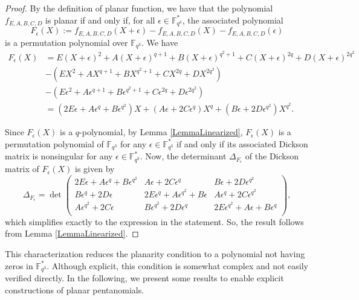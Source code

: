 \documentclass[12pt]{amsart}
\def\e{\epsilon}
\def\fqt{\mathbb{F}_{q^3}}
\def\e{\epsilon}
\begin{document}
	\begin{proof}
		By the definition of planar function, we have that the polynomial $f_{E,A,B,C,D}$ is planar if and only if, for all
		$ \epsilon \in \mathbb{F}_{q^3}^*$, the associated polynomial $$F_{\epsilon}(X):=f_{E,A,B,C,D}(X+\epsilon)-f_{E,A,B,C,D}(X)-f_{E,A,B,C,D}(\epsilon)$$ is a permutation polynomial over $\mathbb{F}_{q^3}$.  We have 
		\begin{align*}
			F_{\epsilon}(X)&= E(X+\e)^2+A(X+\e)^{q+1}+ B(X+\e)^{q^2+1}+C(X+\e)^{2q} +D(X+\e)^{2q^2}\\
			&-(EX^2+ AX^{q+1}+ BX^{q^2+1}+CX^{2q} +DX^{2q^2})\\
			&-(E\e^2 + A\e^{q+1}+ B\e^{q^2+1}+C\e^{2q} +D\e^{2q^2})\\
			&=(2E\e + A \epsilon^q + B \epsilon^{q^2})X + (A \epsilon + 2C \epsilon^q)X^q + (B \epsilon + 2D \epsilon^{q^2})X^{q^2}.
		\end{align*}
		
		
		Since $F_{\epsilon}(X)$  is a $q$-polynomial, by Lemma \ref{LemmaLinearized}, $F_{\epsilon}(X)$ is a permutation polynomial of $\fqt$ for any $\epsilon \in \mathbb{F}_{q^3}^*$  if and only if its associated Dickson matrix is  nonsingular for any $\epsilon \in \mathbb{F}_{q^3}^*$. Now, the determinant $\Delta_{F_{\epsilon}}$ of the Dickson matrix of $F_{\epsilon}(X)$ is given by 
		\[
		\Delta_{F_{\epsilon}} = 
		\det\begin{pmatrix}
			2E\e + A \epsilon^{q} + B \epsilon^{q^2} &  A \epsilon + 2 C \epsilon^{q}      	&B \epsilon + 2 D \epsilon^{q^2} \\
			B \epsilon^{q} + 2 D \epsilon 		   & 2E\e^q + A \epsilon^{q^2} + B \epsilon  &    A \epsilon^{q} + 2 C \epsilon^{q^2} \\
			A \epsilon^{q^2} + 2 C \epsilon  &   B \epsilon^{q^2} + 2 D \epsilon^{q} 	& 2E\e^{q^2} + A \epsilon + B \epsilon^{q}\\
		\end{pmatrix}, 
		\]
		which simplifies exactly to the expression in the statement. So, the result follows from Lemma \ref{LemmaLinearized}. 
	\end{proof}
	
	This characterization reduces the planarity condition to  a polynomial not having zeros in  $\mathbb{F}_{q^3}^\ast$. Although explicit, this condition is somewhat complex and not easily verified directly. In the following, we present some results to enable explicit constructions of planar pentanomials.
		
\end{document}
